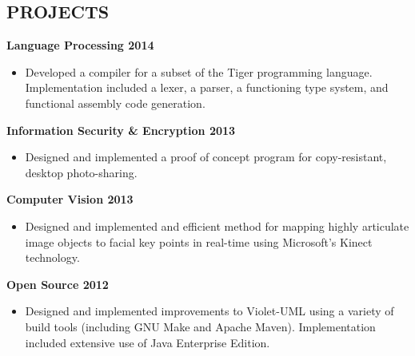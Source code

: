 \documentclass[line, margin]{res}
\begin{document}
\begin{resume}
\section{PROJECTS}
    \textbf{Language Processing \hfill 2014 }
    \begin{itemize}  \itemsep -2pt %
        \item Developed a compiler for a subset of the Tiger programming language. Implementation included a lexer, a parser, a functioning type system, and functional assembly code generation.
    \end{itemize}
    \textbf{Information Security \& Encryption \hfill 2013 }
    \begin{itemize}  \itemsep -2pt %
        \item Designed and implemented a proof of concept program for copy-resistant, desktop photo-sharing.
    \end{itemize}\textbf{Computer Vision \hfill 2013 }
    \begin{itemize}  \itemsep -2pt %
        \item Designed and implemented and efficient method for mapping highly articulate image objects to facial key points in real-time using Microsoft’s Kinect technology.
    \end{itemize}
    \textbf{Open Source \hfill 2012 }
    \begin{itemize}  \itemsep -2pt %
        \item Designed and implemented improvements to Violet-UML using a variety of build tools (including GNU Make and Apache Maven). Implementation included extensive use of Java Enterprise Edition.
    \end{itemize}


\end{resume}
\end{document}
